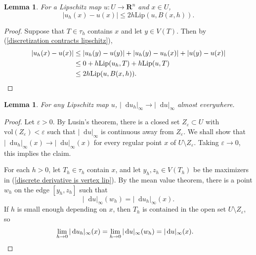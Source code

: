 \documentclass[reqno,11pt]{amsart}
\newcommand{\RR}{\mathbf{R}}
\newcommand*\dif{\mathop{}\!\mathrm{d}}
\newcommand{\vol}{\mathrm{vol}}
\newcommand{\Lip}{\mathrm{Lip}}
\newtheorem{lemma}[theorem]{Lemma}
\theoremstyle{definition}
\numberwithin{equation}{section}
\begin{document}
\begin{lemma}
For a Lipschitz map $u: U \to \RR^n$ and $x \in U$,
$$|u_h(x) - u(x)| \leq 2h \Lip(u, B(x, h)).$$
\end{lemma}
\begin{proof}
Suppose that $T \in \tau_h$ contains $x$ and let $y \in V(T)$.
Then by (\ref{discretization contracts lipschitz}),
\begin{align*}
|u_h(x) - u(x)|
&\leq |u_h(y) - u(y)| + |u_h(y) - u_h(x)| + |u(y) - u(x)| \\
&\leq 0 + h\Lip(u_h, T) + h\Lip(u, T) \\
&\leq 2h \Lip(u, B(x, h)). \qedhere
\end{align*}
\end{proof}

\begin{lemma}
For any Lipschitz map $u$, $|\dif u_h|_\infty \to |\dif u|_\infty$ almost everywhere.
\end{lemma}
\begin{proof}
Let $\varepsilon > 0$.
By Lusin's theorem, there is a closed set $Z_\varepsilon \subset U$ with $\vol(Z_\varepsilon) < \varepsilon$ such that $|\dif u|_\infty$ is continuous away from $Z_\varepsilon$.
We shall show that $|\dif u_h|_\infty(x) \to |\dif u|_\infty(x)$ for every regular point $x$ of $U \setminus Z_\varepsilon$.
Taking $\varepsilon \to 0$, this implies the claim.

For each $h > 0$, let $T_h \in \tau_h$ contain $x$, and let $y_h, z_h \in V(T_h)$ be the maximizers in (\ref{discrete derivative is vertex lip}).
By the mean value theorem, there is a point $w_h$ on the edge $[y_h, z_h]$ such that
$$|\dif u|_\infty(w_h) = |\dif u_h|_\infty(x).$$
If $h$ is small enough depending on $x$, then $T_h$ is contained in the open set $U \setminus Z_\varepsilon$, so 
\begin{align*}
\lim_{h \to 0} |\dif u_h|_\infty(x) = \lim_{h \to 0} |\dif u|_\infty(w_h) &= |\dif u|_\infty(x). \qedhere
\end{align*}
\end{proof}

\end{document}
